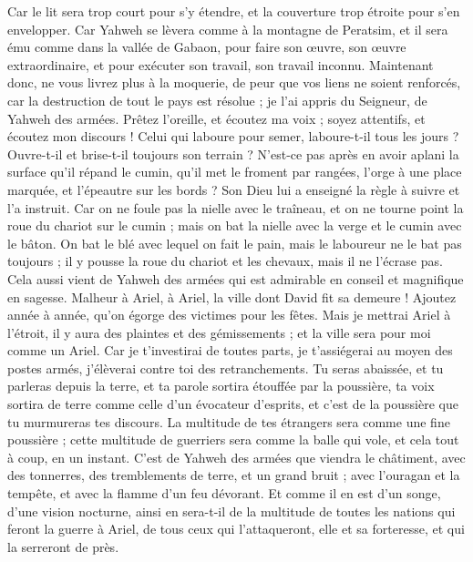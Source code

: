 \begin{multicols}{2}
Car le lit sera trop court pour s'y étendre, et la couverture trop étroite pour s'en envelopper.
Car Yahweh se lèvera comme à la montagne de Peratsim, et il sera ému comme dans la vallée de Gabaon, pour faire son œuvre, son œuvre extraordinaire, et pour exécuter son travail, son travail inconnu.
Maintenant donc, ne vous livrez plus à la moquerie, de peur que vos liens ne soient renforcés, car la destruction de tout le pays est résolue ; je l'ai appris du Seigneur, de Yahweh des armées.
Prêtez l'oreille, et écoutez ma voix ; soyez attentifs, et écoutez mon discours !
Celui qui laboure pour semer, laboure-t-il tous les jours ? Ouvre-t-il et brise-t-il toujours son terrain ?
N'est-ce pas après en avoir aplani la surface qu'il répand le cumin, qu'il met le froment par rangées, l'orge à une place marquée, et l'épeautre sur les bords ?
Son Dieu lui a enseigné la règle à suivre et l'a instruit.
Car on ne foule pas la nielle avec le traîneau, et on ne tourne point la roue du chariot sur le cumin ; mais on bat la nielle avec la verge et le cumin avec le bâton.
On bat le blé avec lequel on fait le pain, mais le laboureur ne le bat pas toujours ; il y pousse la roue du chariot et les chevaux, mais il ne l'écrase pas.
Cela aussi vient de Yahweh des armées qui est admirable en conseil et magnifique en sagesse.
\VerseOne{}Malheur à Ariel, à Ariel, la ville dont David fit sa demeure ! Ajoutez année à année, qu'on égorge des victimes pour les fêtes.
Mais je mettrai Ariel à l'étroit, il y aura des plaintes et des gémissements ; et la ville sera pour moi comme un Ariel.
Car je t'investirai de toutes parts, je t'assiégerai au moyen des postes armés, j'élèverai contre toi des retranchements.
Tu seras abaissée, et tu parleras depuis la terre, et ta parole sortira étouffée par la poussière, ta voix sortira de terre comme celle d'un évocateur d'esprits, et c'est de la poussière que tu murmureras tes discours.
La multitude de tes étrangers sera comme une fine poussière ; cette multitude de guerriers sera comme la balle qui vole, et cela tout à coup, en un instant.
C'est de Yahweh des armées que viendra le châtiment, avec des tonnerres, des tremblements de terre, et un grand bruit ; avec l'ouragan et la tempête, et avec la flamme d'un feu dévorant.
Et comme il en est d'un songe, d'une vision nocturne, ainsi en sera-t-il de la multitude de toutes les nations qui feront la guerre à Ariel, de tous ceux qui l'attaqueront, elle et sa forteresse, et qui la serreront de près.

\end{multicols}
